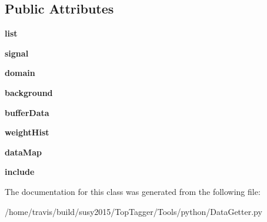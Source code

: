 \subsection*{Public Attributes}
\begin{DoxyCompactItemize}
\item 
\hypertarget{classDataGetter_1_1DataGetter_a2739938ac344ad65b1d2e25e2c787419}{{\bfseries list}}\label{classDataGetter_1_1DataGetter_a2739938ac344ad65b1d2e25e2c787419}

\item 
\hypertarget{classDataGetter_1_1DataGetter_a7e7816b063af6cb91da3d8aa8d48fc2b}{{\bfseries signal}}\label{classDataGetter_1_1DataGetter_a7e7816b063af6cb91da3d8aa8d48fc2b}

\item 
\hypertarget{classDataGetter_1_1DataGetter_a0d579f0002f299b988848850aabddad8}{{\bfseries domain}}\label{classDataGetter_1_1DataGetter_a0d579f0002f299b988848850aabddad8}

\item 
\hypertarget{classDataGetter_1_1DataGetter_ab04199c95788aae9665d4c1b2677b6eb}{{\bfseries background}}\label{classDataGetter_1_1DataGetter_ab04199c95788aae9665d4c1b2677b6eb}

\item 
\hypertarget{classDataGetter_1_1DataGetter_a9d4f5ce1a7aae31b19aa9171cb0b62ac}{{\bfseries buffer\-Data}}\label{classDataGetter_1_1DataGetter_a9d4f5ce1a7aae31b19aa9171cb0b62ac}

\item 
\hypertarget{classDataGetter_1_1DataGetter_a0dfc16a5a8a63d7590cefe921ac11bef}{{\bfseries weight\-Hist}}\label{classDataGetter_1_1DataGetter_a0dfc16a5a8a63d7590cefe921ac11bef}

\item 
\hypertarget{classDataGetter_1_1DataGetter_ad47a039976844990578f9b9d5e2301c3}{{\bfseries data\-Map}}\label{classDataGetter_1_1DataGetter_ad47a039976844990578f9b9d5e2301c3}

\item 
\hypertarget{classDataGetter_1_1DataGetter_af6e513c016784cad32bfefc956b5f885}{{\bfseries include}}\label{classDataGetter_1_1DataGetter_af6e513c016784cad32bfefc956b5f885}

\end{DoxyCompactItemize}


The documentation for this class was generated from the following file\-:\begin{DoxyCompactItemize}
\item 
/home/travis/build/susy2015/\-Top\-Tagger/\-Tools/python/Data\-Getter.\-py\end{DoxyCompactItemize}
